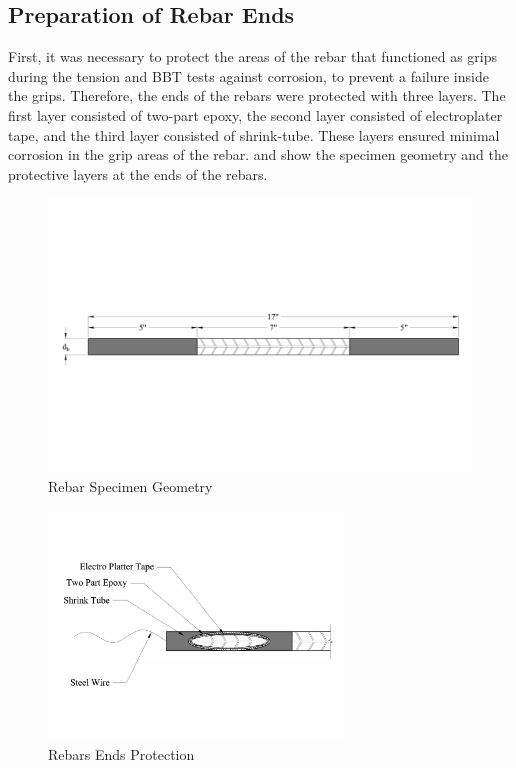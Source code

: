 \subsection{Preparation of Rebar Ends}

First, it was necessary to protect the areas of the rebar that functioned as grips during the tension and BBT tests against corrosion, to prevent a failure inside the grips. Therefore, the ends of the rebars were protected with three layers. The first layer consisted of two-part epoxy, the second layer consisted of electroplater tape, and the third layer consisted of shrink-tube. These layers ensured minimal corrosion in the grip areas of the rebar.  and  show the specimen geometry and the protective layers at the ends of the rebars.
\begin{figure}[htbp]
	\centering
	\includegraphics[width=1.0\textwidth]{Chapter-3/figs/RebarSamples}
	\caption{Rebar Specimen Geometry}
	\label{fig:RebarSpecimenGeomtry}
\end{figure}

\begin{figure}[htbp]
	\centering
	\includegraphics[width=0.7\textwidth]{Chapter-3/figs/Rebar_Ends}
	\caption{Rebars Ends Protection}
	\label{fig:RebarEndsProtection}
\end{figure}
\newpage 

